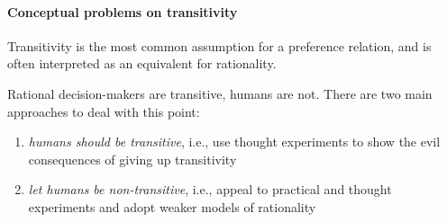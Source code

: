 \paragraph{Conceptual problems on transitivity} Transitivity is the most common assumption for a preference relation, and is often interpreted as an equivalent for rationality.

Rational decision-makers are transitive, humans are not. There are two main approaches to deal with this point:
\begin{enumerate}
	\item \textit{humans should be transitive}, i.e., use thought experiments to show the evil consequences of giving up transitivity
	
	\item \textit{let humans be non-transitive}, i.e., appeal to practical and thought experiments and adopt weaker models of rationality
\end{enumerate}

